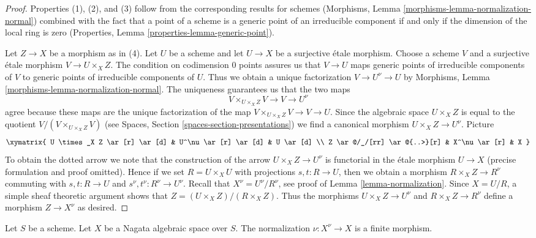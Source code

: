\begin{proof}
Properties (1), (2), and (3) follow from the corresponding results
for schemes (Morphisms, Lemma \ref{morphisms-lemma-normalization-normal})
combined with the fact that a point of a scheme is a generic
point of an irreducible component if and only if the dimension
of the local ring is zero
(Properties, Lemma \ref{properties-lemma-generic-point}).

\medskip\noindent
Let $Z \to X$ be a morphism as in (4). Let $U$ be a scheme and let
$U \to X$ be a surjective \'etale morphism. Choose a scheme $V$ and
a surjective \'etale morphism $V \to U \times_X Z$. The condition on
codimension $0$ points assures us that $V \to U$ maps generic points of
irreducible components of $V$ to generic points of irreducible
components of $U$. Thus we obtain a unique factorization
$V \to U^\nu \to U$ by
Morphisms, Lemma \ref{morphisms-lemma-normalization-normal}.
The uniqueness guarantees us that the two maps
$$
V \times_{U \times_X Z} V \to V \to U^\nu
$$
agree because these maps are the unique factorization of the map
$V \times_{U \times_X Z} V \to V \to U$.
Since the algebraic space $U \times_X Z$ is equal to the quotient
$V/(V \times_{U \times_X Z} V)$
(see Spaces, Section \ref{spaces-section-presentations})
we find a canonical morphism
$U \times_X Z \to U^\nu$. Picture
$$
\xymatrix{
U \times_X Z \ar[r] \ar[d] & U^\nu \ar[r] \ar[d] & U \ar[d] \\
Z \ar@/_/[rr] \ar@{..>}[r] & X^\nu \ar[r] & X
}
$$
To obtain the dotted arrow we note that the construction of the
arrow $U \times_X Z \to U^\nu$ is functorial in the \'etale morphism $U \to X$
(precise formulation and proof omitted).
Hence if we set $R = U \times_X U$ with projections $s, t : R \to U$,
then we obtain a morphism $R \times_X Z \to R^\nu$ commuting with
$s, t : R \to U$ and $s^\nu, t^\nu : R^\nu \to U^\nu$.
Recall that $X^\nu = U^\nu/R^\nu$, see proof of
Lemma \ref{lemma-normalization}. Since $X = U/R$, a
simple sheaf theoretic argument
shows that $Z = (U \times_X Z)/(R \times_X Z)$. Thus the morphisms
$U \times_X Z \to U^\nu$ and $R \times_X Z \to R^\nu$ define a
morphism $Z \to X^\nu$ as desired.
\end{proof}

\begin{lemma}
\label{lemma-nagata-normalization}
Let $S$ be a scheme. Let $X$ be a Nagata algebraic space over $S$.
The normalization $\nu : X^\nu \to X$ is a finite morphism.
\end{lemma}

